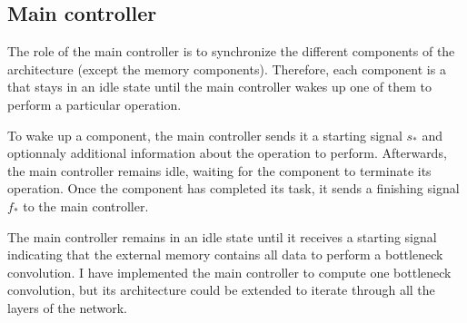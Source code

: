 \subsection{Main controller}
%
The role of the main controller is to synchronize the different components of the architecture (except the memory components). Therefore, each component is a  that stays in an idle state until the main controller wakes up one of them to perform a particular operation.

To wake up a component, the main controller sends it a starting signal $s_{*}$ and optionnaly additional information about the operation to perform. Afterwards, the main controller remains idle, waiting for the component to terminate its operation. Once the component has completed its task, it sends a finishing signal $f_{*}$ to the main controller.

The main controller remains in an idle state until it receives a starting signal indicating that the external memory contains all data to perform a bottleneck convolution. I have implemented the main controller to compute one bottleneck convolution, but its architecture could be extended to iterate through all the layers of the network.

